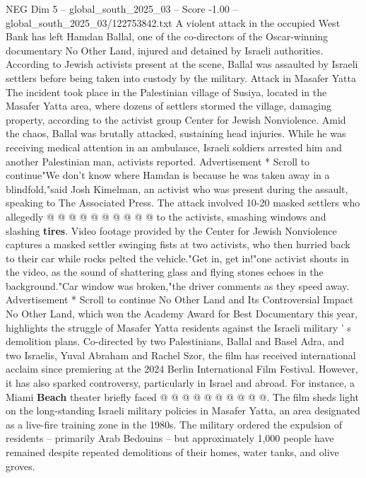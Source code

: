 \begin{textsample}{NEG Dim 5 – global\_south\_2025\_03 – Score -1.00 – global\_south\_2025\_03/122753842.txt}  \label{ex:f5_neg_275}
A violent attack in the occupied West Bank has left Hamdan Ballal, one of the co-directors of the Oscar-winning documentary No Other Land, injured and detained by Israeli authorities.
According to Jewish activists present at the scene, Ballal was assaulted by Israeli settlers before being taken into custody by the military.
Attack in Masafer Yatta The incident took place in the Palestinian village of Susiya, located in the Masafer Yatta area, where dozens of settlers stormed the village, damaging property, according to the activist group Center for Jewish Nonviolence.
Amid the chaos, Ballal was brutally attacked, sustaining head injuries.
While he was receiving medical attention in an ambulance, Israeli soldiers arrested him and another Palestinian man, activists reported.
Advertisement * Scroll to continue"We don't know where Hamdan is because he was taken away in a blindfold,"said Josh Kimelman, an activist who was present during the assault, speaking to The Associated Press.
The attack involved 10-20 masked settlers who allegedly @ @ @ @ @ @ @ @ @ @ to the activists, smashing windows and slashing \textbf{tires}.
Video footage provided by the Center for Jewish Nonviolence captures a masked settler swinging fists at two activists, who then hurried back to their car while rocks pelted the vehicle."Get in, get in!"one activist shouts in the video, as the sound of shattering glass and flying stones echoes in the background."Car window was broken,"the driver comments as they speed away.
Advertisement * Scroll to continue No Other Land and Its Controversial Impact No Other Land, which won the Academy Award for Best Documentary this year, highlights the struggle of Masafer Yatta residents against the Israeli military ' s demolition plans.
Co-directed by two Palestinians, Ballal and Basel Adra, and two Israelis, Yuval Abraham and Rachel Szor, the film has received international acclaim since premiering at the 2024 Berlin International Film Festival.
However, it has also sparked controversy, particularly in Israel and abroad.
For instance, a Miami \textbf{Beach} theater briefly faced @ @ @ @ @ @ @ @ @ @.
The film sheds light on the long-standing Israeli military policies in Masafer Yatta, an area designated as a live-fire training zone in the 1980s.
The military ordered the expulsion of residents -- primarily Arab Bedouins -- but approximately 1,000 people have remained despite repeated demolitions of their homes, water tanks, and olive groves.

\end{textsample}

